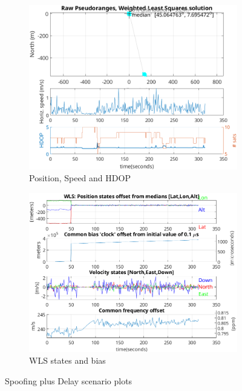 \begin{figure}[h!]
            \hfill
            \begin{subfigure}{0.23\textwidth}
                \vspace{0.40cm}
                \includegraphics[width=\textwidth]{images/tests/Monte_Cappuccini/Spoofing/task6_figures/Samsung_A51_Monte_Cappuccini_fig4.png}
                \caption{Position, Speed and HDOP}
                \label{fig:Delay_c}
            \end{subfigure}
            \hfill
            \begin{subfigure}{0.23\textwidth}
                \vspace{0.40cm}
                \includegraphics[width=\textwidth]{images/tests/Monte_Cappuccini/Spoofing/task6_figures/Samsung_A51_Monte_Cappuccini_fig5.png}
                \caption{WLS states and bias}
                \label{fig:Delay_d}
            \end{subfigure}
            \vspace{0.35cm}
            \caption{Spoofing plus Delay scenario plots}
            \label{fig:delay_plots}
        \end{figure}


